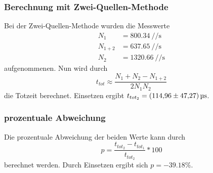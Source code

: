 \subsubsection*{Berechnung mit Zwei-Quellen-Methode}
        Bei der Zwei-Quellen-Methode wurden die Messwerte
        \begin{align*}
            N_1 &= \SI{800.34}{\per\per\second}\\ %
            N_{1+2} &= \SI{637.65}{\per\per\second}\\
            N_2 &= \SI{1320.66}{\per\per\second}
        \end{align*}
        aufgenommenen. Nun wird durch 
        \begin{equation*}
            t_{tot}\approx \frac{N_1+N_2-N_{1+2}}{2N_1N_2}
        \end{equation*}
        die Totzeit berechnet. Einsetzen ergibt $t_{tot_2}=\SI{114.96 \pm 47.27}{\micro\second}$.
\subsubsection*{prozentuale Abweichung}
Die prozentuale Abweichung der beiden Werte kann durch 
\begin{equation}
    p=\frac{t_{tot_2}-t_{tot_1}}{t_{tot_2}}*100
\end{equation}
berechnet werden. Durch Einsetzen ergibt sich $p=\num{-39.18}\%$.

